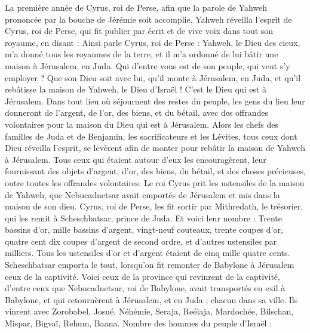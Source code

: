 \begin{multicols}{2}
\VerseOne{}La première année de Cyrus, roi de Perse, afin que la parole de Yahweh prononcée par la bouche de Jérémie soit accomplie,  Yahweh réveilla l'esprit de Cyrus, roi de Perse, qui fit publier par écrit et de vive voix dans tout son royaume, en disant :
Ainsi parle Cyrus, roi de Perse : Yahweh, le Dieu des cieux, m'a donné tous les royaumes de la terre, et il m'a ordonné de lui bâtir une maison à Jérusalem, en Juda.
Qui d'entre vous est de son peuple, qui veut s'y employer ? Que son Dieu soit avec lui, qu'il monte à Jérusalem, en Juda, et qu'il rebâtisse la maison de Yahweh, le Dieu d'Israël ! C'est le Dieu qui est à Jérusalem.
Dans tout lieu où séjournent des restes du peuple,  les gens du lieu leur donneront de l’argent, de l’or, des biens, et du bétail, avec des offrandes volontaires pour la maison du Dieu qui est à Jérusalem.
Alors les chefs des familles de Juda et de Benjamin, les sacrificateurs et les Lévites, tous ceux dont Dieu réveilla l'esprit, se levèrent afin de monter pour rebâtir la maison de Yahweh à Jérusalem.
Tous ceux qui étaient autour d'eux les encouragèrent, leur fournissant des objets d'argent, d'or, des biens, du bétail, et des choses précieuses, outre toutes les offrandes volontaires.
Le roi Cyrus prit les ustensiles de la maison de Yahweh, que Nebucadnetsar avait emportés de Jérusalem et mis dans la maison de son dieu.
Cyrus, roi de Perse, les fit sortir par Mithredath, le trésorier, qui les remit à Scheschbatsar, prince de Juda.
Et voici leur nombre : Trente bassins d'or, mille bassins d'argent, vingt-neuf couteaux,
trente coupes d'or, quatre cent dix coupes d'argent de second ordre, et d'autres ustensiles par milliers.
Tous les ustensiles d'or et d'argent étaient de cinq mille quatre cents. Scheschbatsar emporta le tout, lorsqu’on fit remonter de Babylone à Jérusalem ceux de la captivité.
\VerseOne{}Voici ceux de la province qui revinrent de la captivité, d'entre ceux que Nebucadnetsar, roi de Babylone, avait transportés en exil à Babylone, et qui retournèrent à Jérusalem, et en Juda ; chacun dans sa ville.
Ils vinrent avec Zorobabel, Josué, Néhémie, Seraja, Reélaja, Mardochée, Bilschan, Mispar, Bigvaï, Rehum, Baana. Nombre des hommes du peuple d'Israël :

\end{multicols}
